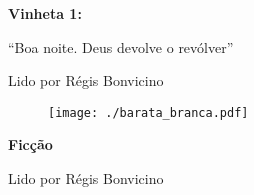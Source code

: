 \pagebreak
\begin{absolutelynopagebreak}
\textbf{Vinheta 1:}

``Boa noite. Deus devolve o revólver''

Lido por Régis Bonvicino


\thispagestyle{empty}

\begin{vplace}
\begin{figure}[H]
\begin{adjustwidth}{-1.7cm}{}
  \vspace*{12.6cm}
  \texttt{[image: ./barata\_branca.pdf]}  
\end{adjustwidth}

\end{figure}
\end{vplace}

\end{absolutelynopagebreak}

\pagebreak

\textbf{Ficção}

Lido por Régis Bonvicino

